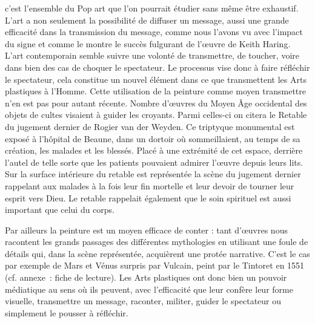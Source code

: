 c'est l'ensemble du Pop art que l'on pourrait étudier sans même être exhaustif. L'art a non seulement la possibilité de diffuser un message, aussi une grande efficacité dans la transmission du message, comme nous l'avons vu avec l'impact du signe et comme le montre le succès fulgurant de l'\oe{}uvre de Keith Haring.
L'art contemporain semble suivre une volonté de transmettre, de toucher, voire dans bien des cas de choquer le spectateur. Le processus vise donc à faire réfléchir le spectateur, cela constitue un nouvel élément dans ce que transmettent les Arts plastiques à l'Homme.
Cette utilisation de la peinture comme moyen transmettre n'en est pas pour autant récente. Nombre d'\oe{}uvres du Moyen Âge occidental des objets de cultes visaient à guider les croyants. Parmi celles-ci on citera le Retable du jugement dernier de Rogier van der Weyden. Ce triptyque monumental est exposé à l'hôpital de Beaune, dans un dortoir où sommeillaient, au temps de sa création, les malades et les blessés. Placé à une extrémité de cet espace, derrière l'autel de telle sorte que les patients pouvaient admirer l'\oe{}uvre depuis leurs lits. Sur la surface intérieure du retable est représentée la scène du jugement dernier rappelant aux malades à la fois leur fin mortelle et leur devoir de tourner leur esprit vers Dieu. Le retable rappelait également que le soin spirituel est aussi important que celui du corps.
\xspace
{} \xspace
Par ailleurs la peinture est un moyen efficace de conter : tant d'\oe{}uvres nous racontent les grands passages des différentes mythologies en utilisant une foule de détails qui, dans la scène représentée, acquièrent une protée narrative. C'est le cas par exemple de Mars et Vénus surpris par Vulcain, peint par le Tintoret en 1551 (cf. annexe : fiche de lecture). Les Arts plastiques ont donc bien un pouvoir médiatique au sens où ils peuvent, avec l'efficacité que leur confère leur forme visuelle, transmettre un message, raconter, militer, guider le spectateur ou simplement le pousser à réfléchir.

